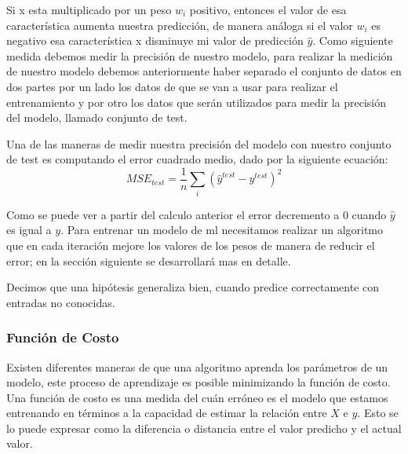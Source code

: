 Si x esta multiplicado por un peso $w_i $ positivo, entonces el valor de esa característica aumenta nuestra predicción, de manera análoga si el valor $w_i $ es negativo esa característica x disminuye mi valor de predicción $\hat{y}$.
Como siguiente medida debemos medir la precisión de nuestro modelo, para realizar la medición de nuestro modelo debemos anteriormente haber separado el conjunto de datos en dos partes por un lado los datos de que se van a usar para realizar el entrenamiento y por otro los datos que serán utilizados para medir la precisión del modelo, llamado conjunto de test.

Una de las maneras de medir nuestra precisión del modelo con nuestro conjunto de test es computando el error cuadrado medio, dado por la siguiente ecuación:
\begin{equation}\label{eqn:mse} 
MSE_{test} = \frac{1}{n}\sum_{i}(\hat{y}^{test}- y^{test})^2
\end{equation}

Como se puede ver a partir del calculo anterior el error decremento a 0 cuando $\hat{y}$ es igual a $y$. Para entrenar un modelo de \ac{ml} necesitamos realizar un algoritmo que en cada iteración mejore los valores de los pesos de manera de reducir el error; en la sección siguiente se desarrollará mas en detalle.

Decimos que una hipótesis generaliza bien, cuando predice correctamente con entradas no conocidas.

\subsubsection{Función de Costo}
Existen diferentes maneras de que una algoritmo aprenda los parámetros de un modelo, este proceso de aprendizaje es posible minimizando la función de costo. Una función de costo es una medida del cuán erróneo es el modelo que estamos entrenando en términos a la capacidad de estimar la relación entre $X $ e $y $. Esto se lo puede expresar como la diferencia o distancia entre el valor predicho y el actual valor.

